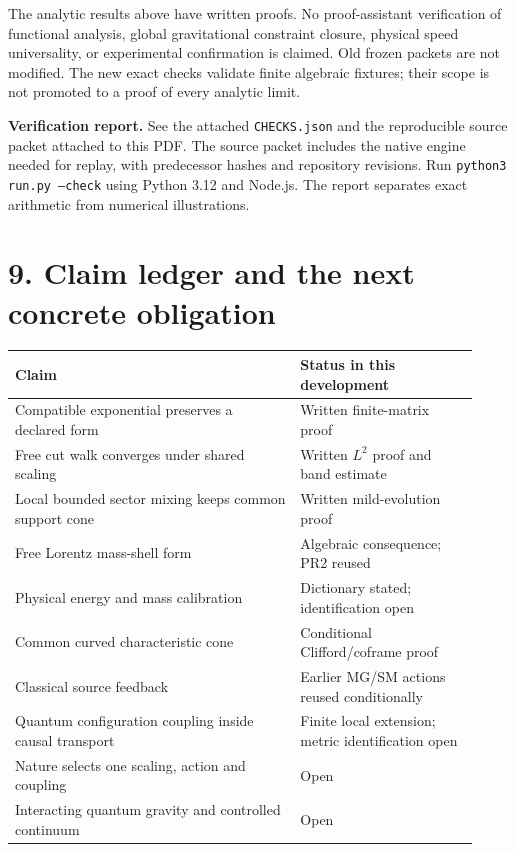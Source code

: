 \documentclass[11pt,a4paper]{article}
\begin{document}
The analytic results above have written proofs. No proof-assistant verification of functional analysis, global gravitational constraint closure, physical speed universality, or experimental confirmation is claimed. Old frozen packets are not modified. The new exact checks validate finite algebraic fixtures; their scope is not promoted to a proof of every analytic limit.

\textbf{Verification report.} See the attached \texttt{CHECKS.json} and the reproducible source packet attached to this PDF. The source packet includes the native engine needed for replay, with predecessor hashes and repository revisions. Run \texttt{python3 run.py --check} using Python 3.12 and Node.js. The report separates exact arithmetic from numerical illustrations.

\newpage
\section*{9. Claim ledger and the next concrete obligation}
\begin{tabular}{>{\raggedright\arraybackslash}p{0.57\linewidth}>{\raggedright\arraybackslash}p{0.35\linewidth}}
\toprule
Claim & Status in this development\\\midrule
Compatible exponential preserves a declared form & Written finite-matrix proof\\[4pt]
Free cut walk converges under shared scaling & Written $L^2$ proof and band estimate\\[4pt]
Local bounded sector mixing keeps common support cone & Written mild-evolution proof\\[4pt]
Free Lorentz mass-shell form & Algebraic consequence; PR2 reused\\[4pt]
Physical energy and mass calibration & Dictionary stated; identification open\\[4pt]
Common curved characteristic cone & Conditional Clifford/coframe proof\\[4pt]
Classical source feedback & Earlier MG/SM actions reused conditionally\\[4pt]
Quantum configuration coupling inside causal transport & Finite local extension; metric identification open\\[4pt]
Nature selects one scaling, action and coupling & Open\\[4pt]
Interacting quantum gravity and controlled continuum & Open\\\bottomrule
\end{tabular}
\end{document}
